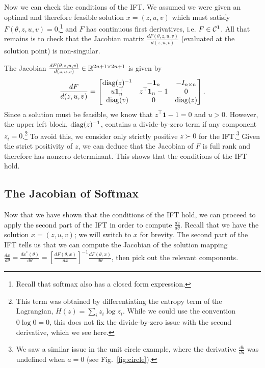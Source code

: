 \documentclass[11pt]{article}
\begin{document}
Now we can check the conditions of the IFT.
We assumed we were given an optimal and therefore feasible solution $x=(z,u,v)$
which must satisfy $F(\theta, z,u,v) = 0$,\footnote{
Recall that softmax also has a closed form expression.}
and $F$ has continuous first derivatives, i.e. $F \in \mathcal{C}^1$.
All that remains is to check that the Jacobian matrix $\frac{dF(\theta,z,u,v)}{d(z,u,v)}$
(evaluated at the solution point) is non-singular.

The Jacobian $\frac{dF(\theta,z,u,v)}{d(z,u,v)}\in\mathbb{R}^{2n+1\times 2n+1}$ is given by
\begin{equation}
\label{eqn:f-jac}
\frac{dF}{d(z,u,v)}=
\begin{bmatrix}
\mathrm{diag}(z)^{-1} & -\mathbf{1}_n & -I_{n\times n} \\
u\mathbf{1}_n^\top & z^\top\mathbf{1}_n - 1 & 0\\
\mathrm{diag}(v) & 0 & \mathrm{diag}(z)
\end{bmatrix}.
\end{equation}
Since a solution must be feasible, we know that $z^\top\mathbf{1}-1=0$ and $u > 0$.
However, the upper left block, $\mathrm{diag}(z)^{-1}$, contains a divide-by-zero term if
any component $z_i = 0$.\footnote{
This term was obtained by differentiating the entropy
term of the Lagrangian, $H(z) = \sum_i z_i\log z_i$.
While we could use the convention $0\log 0 = 0$,
this does not fix the divide-by-zero issue with the second derivative, which we see here.
}
To avoid this, we consider only strictly positive $z \succ 0$ for the IFT.\footnote{
We saw a similar issue in the unit circle example, where the derivative
$\frac{db}{da}$ was undefined when $a=0$ (see Fig.~\ref{fig:circle}).
}
Given the strict positivity of $z$,
we can deduce that the Jacobian of $F$ is full rank and therefore has nonzero determinant.
This shows that the conditions of the IFT hold.

\subsection{The Jacobian of Softmax}
Now that we have shown that the conditions of the IFT hold,
we can proceed to apply the second part of the IFT in order to compute $\frac{dz}{d\theta}$.
Recall that we have the solution $x = (z,u,v)$; we will switch to $x$ for brevity.
The second part of the IFT tells us that we can compute the Jacobian of the
solution mapping $\frac{dx}{d\theta} = \frac{dx^*(\theta)}{d\theta}
= \left[\frac{dF(\theta,x)}{dx}\right]^{-1}\frac{dF(\theta,x)}{d\theta}$,
then pick out the relevant components.
\end{document}
